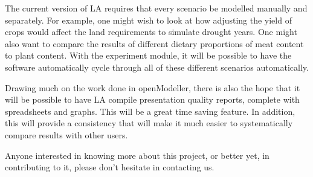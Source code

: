 The current version of LA requires that every scenario be modelled
manually and separately.  For example, one might wish to look at how adjusting
the yield of crops would affect the land requirements to simulate drought
years.  One might also want to compare the results of different dietary
proportions of meat content to plant content.  With the experiment module, it
will be possible to have the software automatically cycle through all of these
different scenarios automatically.

Drawing much on the work done in openModeller, there is also the hope that it
will be possible to have LA compile presentation quality reports,
complete with spreadsheets and graphs.  This will be a great time saving
feature.  In addition, this will provide a consistency that will make it much
easier to systematically compare results with other users.

Anyone interested in knowing more about this project, or better yet, in
contributing to it, please don't hesitate in contacting us.











\begin{footnotesize}



\end{footnotesize}


\address{Jason Jorgenson\\ University of Liverpool\\
\url{http://www.arkygeek.com} (under development)\\
}

\address{Tim Sutton\\ Centro de Referncia em Informao Ambiental, CRIA\\
\url{http://cria.org.br}\\
}

